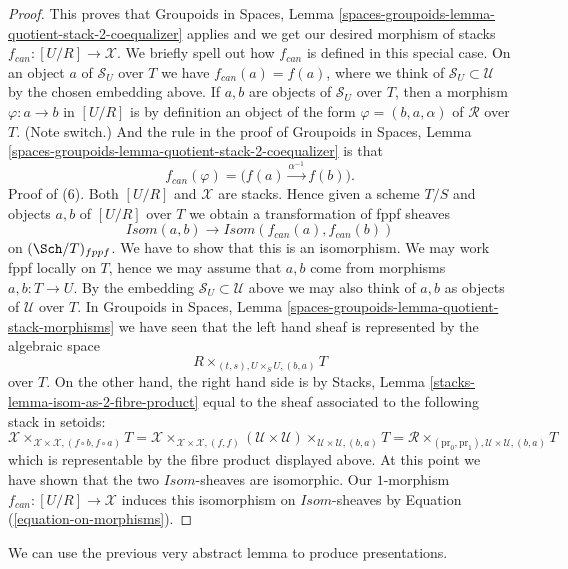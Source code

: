 \begin{proof}
\medskip\noindent
This proves that
Groupoids in Spaces,
Lemma \ref{spaces-groupoids-lemma-quotient-stack-2-coequalizer}
applies and we get our desired morphism of stacks
$f_{can} : [U/R] \to \mathcal{X}$. We briefly spell out how
$f_{can}$ is defined in this special case.
On an object $a$ of $\mathcal{S}_U$ over $T$
we have $f_{can}(a) = f(a)$, where we think of
$\mathcal{S}_U \subset \mathcal{U}$ by the chosen embedding above.
If $a, b$ are objects of $\mathcal{S}_U$ over $T$, then a morphism
$\varphi : a \to b$ in $[U/R]$ is by definition an object of the
form $\varphi = (b, a, \alpha)$ of $\mathcal{R}$ over $T$. (Note
switch.) And the rule in the proof of
Groupoids in Spaces,
Lemma \ref{spaces-groupoids-lemma-quotient-stack-2-coequalizer}
is that
\begin{equation}
\label{equation-on-morphisms}
f_{can}(\varphi) = \Big(f(a) \xrightarrow{\alpha^{-1}} f(b)\Big).
\end{equation}
Proof of (6). Both $[U/R]$ and $\mathcal{X}$ are stacks.
Hence given a scheme $T/S$ and objects $a, b$ of $[U/R]$
over $T$ we obtain a transformation of fppf sheaves
$$
\mathit{Isom}(a, b) \longrightarrow \mathit{Isom}(f_{can}(a), f_{can}(b))
$$
on $(\Sch/T)_{fppf}$. We have to show that this is an
isomorphism. We may work fppf locally on $T$, hence we may assume that
$a, b$ come from morphisms $a, b : T \to U$. By the embedding
$\mathcal{S}_U \subset \mathcal{U}$ above we may also think of $a, b$ as
objects of $\mathcal{U}$ over $T$. In
Groupoids in Spaces,
Lemma \ref{spaces-groupoids-lemma-quotient-stack-morphisms}
we have seen that the left hand sheaf is represented by the algebraic space
$$
R \times_{(t, s), U \times_S U, (b, a)} T
$$
over $T$. On the other hand, the right hand side is by
Stacks, Lemma \ref{stacks-lemma-isom-as-2-fibre-product}
equal to the sheaf associated to the following stack in setoids:
$$
\mathcal{X}
\times_{\mathcal{X} \times \mathcal{X}, (f \circ b, f \circ a)} T =
\mathcal{X}
\times_{\mathcal{X} \times \mathcal{X}, (f, f)}
(\mathcal{U} \times \mathcal{U})
\times_{\mathcal{U} \times \mathcal{U}, (b, a)} T =
\mathcal{R}
\times_{(\text{pr}_0, \text{pr}_1), \mathcal{U} \times \mathcal{U}, (b, a)} T
$$
which is representable by the fibre product displayed above.
At this point we have shown that the two $\mathit{Isom}$-sheaves
are isomorphic. Our $1$-morphism $f_{can} : [U/R] \to \mathcal{X}$ induces
this isomorphism on $\mathit{Isom}$-sheaves by
Equation (\ref{equation-on-morphisms}).
\end{proof}

We can use the previous very abstract lemma to produce
presentations.

